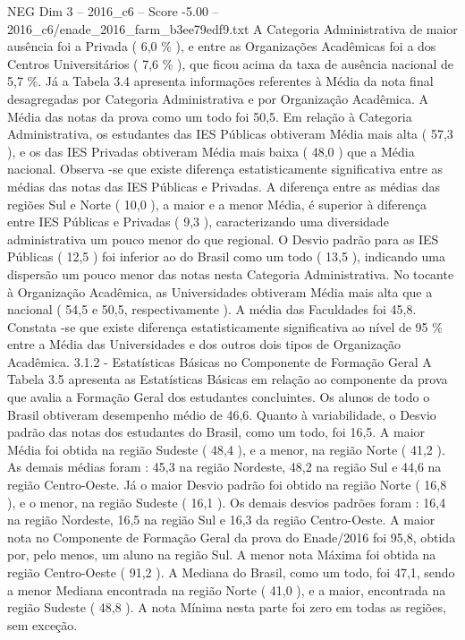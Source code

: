 \begin{textsample}{NEG Dim 3 – 2016\_c6 – Score -5.00 – 2016\_c6/enade\_2016\_farm\_b3ee79edf9.txt}
A Categoria Administrativa de maior ausência foi a Privada ( 6,0 \% ), e entre as Organizações Acadêmicas foi a dos Centros Universitários ( 7,6 \% ), que ficou acima da taxa de ausência nacional de 5,7 \%.
Já a Tabela 3.4 apresenta informações referentes à Média da nota final desagregadas por Categoria Administrativa e por Organização Acadêmica.
A Média das notas da prova como um todo foi 50,5.
Em relação à Categoria Administrativa, os estudantes das IES Públicas obtiveram Média mais alta ( 57,3 ), e os das IES Privadas obtiveram Média mais baixa ( 48,0 ) que a Média nacional.
Observa -se que existe diferença estatisticamente significativa entre as médias das notas das IES Públicas e Privadas.
A diferença entre as médias das regiões Sul e Norte ( 10,0 ), a maior e a menor Média, é superior à diferença entre IES Públicas e Privadas ( 9,3 ), caracterizando uma diversidade administrativa um pouco menor do que regional.
O Desvio padrão para as IES Públicas ( 12,5 ) foi inferior ao do Brasil como um todo ( 13,5 ), indicando uma dispersão um pouco menor das notas nesta Categoria Administrativa.
No tocante à Organização Acadêmica, as Universidades obtiveram Média mais alta que a nacional ( 54,5 e 50,5, respectivamente ).
A média das Faculdades foi 45,8.
Constata -se que existe diferença estatisticamente significativa ao nível de 95 \% entre a Média das Universidades e dos outros dois tipos de Organização Acadêmica. 3.1.2 - Estatísticas Básicas no Componente de Formação Geral A Tabela 3.5 apresenta as Estatísticas Básicas em relação ao componente da prova que avalia a Formação Geral dos estudantes concluintes.
Os alunos de todo o Brasil obtiveram desempenho médio de 46,6.
Quanto à variabilidade, o Desvio padrão das notas dos estudantes do Brasil, como um todo, foi 16,5.
A maior Média foi obtida na região Sudeste ( 48,4 ), e a menor, na região Norte ( 41,2 ).
As demais médias foram : 45,3 na região Nordeste, 48,2 na região Sul e 44,6 na região Centro-Oeste.
Já o maior Desvio padrão foi obtido na região Norte ( 16,8 ), e o menor, na região Sudeste ( 16,1 ).
Os demais desvios padrões foram : 16,4 na região Nordeste, 16,5 na região Sul e 16,3 da região Centro-Oeste.
A maior nota no Componente de Formação Geral da prova do Enade/2016 foi 95,8, obtida por, pelo menos, um aluno na região Sul.
A menor nota Máxima foi obtida na região Centro-Oeste ( 91,2 ).
A Mediana do Brasil, como um todo, foi 47,1, sendo a menor Mediana encontrada na região Norte ( 41,0 ), e a maior, encontrada na região Sudeste ( 48,8 ).
A nota Mínima nesta parte foi zero em todas as regiões, sem exceção.

\end{textsample}
